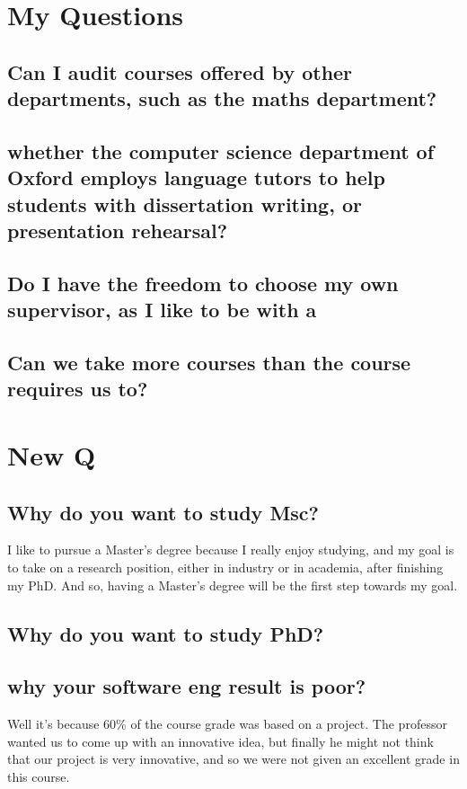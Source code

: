 \documentclass[12pt, landscape]{article}
\begin{document}
\begin{multicols}{2}
\section{My Questions}
\subsection{Can I audit courses offered by other departments, such as the maths department?}
\subsection{whether the computer science department of Oxford employs language tutors to help students with dissertation writing, or presentation rehearsal?}
\subsection{Do I have the freedom to choose my own supervisor, as I like to be with a }
\subsection{Can we take more courses than the course requires us to?}
\subsection{}



\section{New Q}

\subsection{Why do you want to study Msc?}
I like to pursue a Master's degree because I really enjoy studying, and my goal is to take on a research position, either in industry or in academia, after finishing my PhD. And so, having a Master's degree will be the first step towards my goal.

\subsection{Why do you want to study PhD?}

\subsection{why your software eng result is poor?}
Well it's because 60\% of the course grade was based on a project. The professor wanted us to come up with an innovative idea, but finally he might not think that our project is very innovative, and so we were not given an excellent grade in this course.


\end{multicols}
\end{document}
